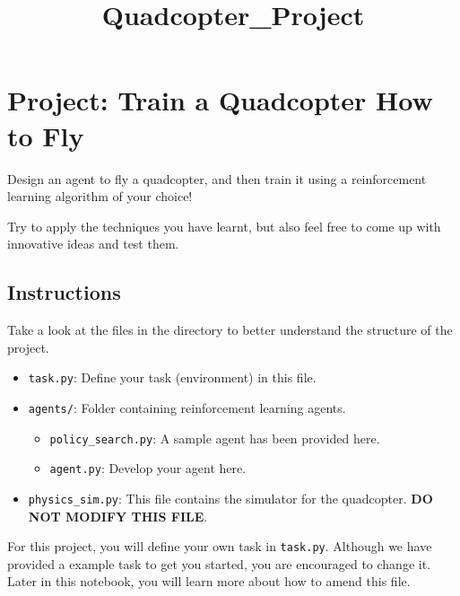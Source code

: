 \documentclass[11pt]{article}
\title{Quadcopter\_Project}
\providecommand{\tightlist}{%
      \setlength{\itemsep}{0pt}\setlength{\parskip}{0pt}}
\begin{document}
    
    
    \maketitle
    
    

    
    \hypertarget{project-train-a-quadcopter-how-to-fly}{%
\section{Project: Train a Quadcopter How to
Fly}\label{project-train-a-quadcopter-how-to-fly}}

Design an agent to fly a quadcopter, and then train it using a
reinforcement learning algorithm of your choice!

Try to apply the techniques you have learnt, but also feel free to come
up with innovative ideas and test them.

    \hypertarget{instructions}{%
\subsection{Instructions}\label{instructions}}

Take a look at the files in the directory to better understand the
structure of the project.

\begin{itemize}
\tightlist
\item
  \texttt{task.py}: Define your task (environment) in this file.
\item
  \texttt{agents/}: Folder containing reinforcement learning agents.

  \begin{itemize}
  \tightlist
  \item
    \texttt{policy\_search.py}: A sample agent has been provided here.
  \item
    \texttt{agent.py}: Develop your agent here.
  \end{itemize}
\item
  \texttt{physics\_sim.py}: This file contains the simulator for the
  quadcopter. \textbf{DO NOT MODIFY THIS FILE}.
\end{itemize}

For this project, you will define your own task in \texttt{task.py}.
Although we have provided a example task to get you started, you are
encouraged to change it. Later in this notebook, you will learn more
about how to amend this file.
\end{document}
